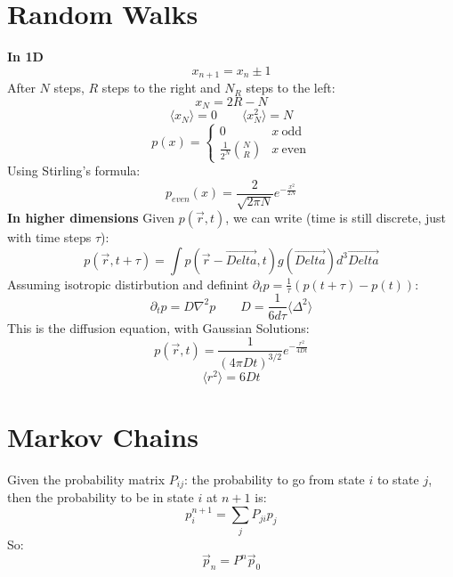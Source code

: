 \documentclass[twocolumn]{article}
\begin{document}
\section{Random Walks}
\textbf{In 1D}
\begin{equation}
    x_{n+1} = x_n \pm 1
\end{equation}
After $N$ steps, $R$ steps to the right and $N_R$ steps to the left:
\begin{equation}
    x_N = 2R - N
\end{equation}
\begin{equation}
    \langle x_N \rangle = 0 \qquad
    \langle x_N^2 \rangle = N
\end{equation}
\begin{equation}
    p(x) = \begin{cases}
        0 & x \ \text{odd} \\
        \frac{1}{2^N}\binom{N}{R} & x \ \text{even}
    \end{cases}
\end{equation}
Using Stirling's formula:
\begin{equation}
    p_{even}(x) = \frac{2}{\sqrt{2\pi N}}e^{-\frac{x^2}{2N}}
\end{equation}
\textbf{In higher dimensions}
\newline
Given $p(\vec{r}, t)$, we can write (time is still discrete, just with time steps $\tau$):
\begin{equation}
    p(\vec{r}, t + \tau) = \int p(\vec{r} - \vec{Delta}, t) g(\vec{Delta}) d^3\vec{Delta}
\end{equation}
Assuming isotropic distirbution and definint $\partial_t p = \frac{1}{\tau}(p(t + \tau) - p(t))$:
\begin{equation}
    \partial_t p = D \nabla^2 p
    \qquad
    D = \frac{1}{6d\tau}\langle \Delta^2 \rangle
\end{equation}
This is the diffusion equation, with Gaussian Solutions:
\begin{equation}
    p(\vec{r}, t) = \frac{1}{\left(4\pi D t\right)^{3/2}} e^{-\frac{r^2}{4Dt}}
\end{equation}
\begin{equation}
    \langle r^2 \rangle = 6Dt    
\end{equation}
\section{Markov Chains}
Given the probability matrix $P_{ij}$: the probability to go from state $i$ to state $j$, then the probability to be in state $i$ at $n+1$ is:
\begin{equation}
    p_i^{n+1} = \sum_j P_{ji}p_j
\end{equation}
So:
\begin{equation}
    \vec{p}_n = P^n \vec{p}_0
\end{equation}
\end{document}
